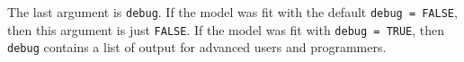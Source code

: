 \documentclass[11pt]{article}\usepackage[]{graphicx}\usepackage[]{color}
\begin{document}
The last argument is \texttt{debug}. If the model was fit with the default \texttt{debug = FALSE}, then this argument is just \texttt{FALSE}. If the model was fit with \texttt{debug = TRUE}, then \texttt{debug} contains a list of output for advanced users and programmers.










\end{document}
